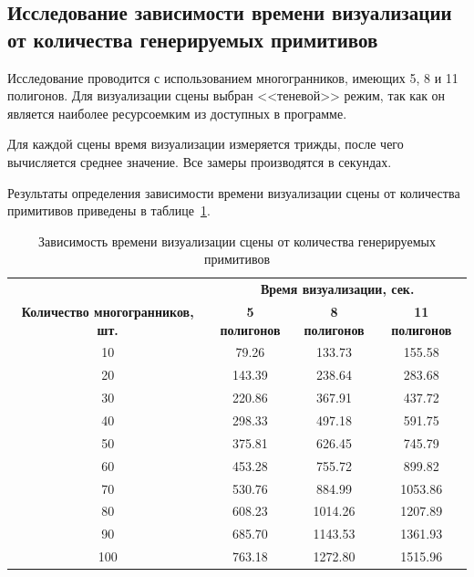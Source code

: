 \subsection{Исследование зависимости времени визуализации от количества генерируемых примитивов}

Исследование проводится с использованием многогранников, имеющих 5, 8 и 11 полигонов. Для визуализации сцены выбран <<теневой>> режим, так как он является наиболее ресурсоемким из доступных в программе.

Для каждой сцены время визуализации измеряется трижды, после чего вычисляется среднее значение. Все замеры производятся в секундах.

Результаты определения зависимости времени визуализации сцены от количества примитивов приведены в таблице~\ref{tbl:research2}.

\begin{table}[ht]
	\small
	\begin{center}
		\begin{threeparttable}
			\caption{Зависимость времени визуализации сцены от количества генерируемых примитивов}
			\begin{tabular}{|c|c|c|c|}
				\hline
				& \multicolumn{3}{c|}{\bfseries Время визуализации, сек.} \\ \cline{2-4}
				\bfseries Количество многогранников, шт. & \bfseries 5 полигонов & \bfseries 8 полигонов & \bfseries 11 полигонов \\
				\hline
				10  & 79.26   & 133.73 & 155.58  \\
				20  & 143.39 & 238.64 & 283.68  \\
				30  & 220.86 & 367.91 & 437.72  \\
				40  & 298.33 & 497.18 & 591.75  \\
				50  & 375.81 & 626.45 & 745.79  \\
				60  & 453.28 & 755.72 & 899.82  \\
				70  & 530.76 & 884.99 & 1053.86 \\
				80  & 608.23 & 1014.26 & 1207.89 \\
				90  & 685.70 & 1143.53 & 1361.93 \\
				100 & 763.18 & 1272.80 & 1515.96 \\
				\hline
			\end{tabular}	
			\label{tbl:research2}
		\end{threeparttable}
	\end{center}
\end{table}

